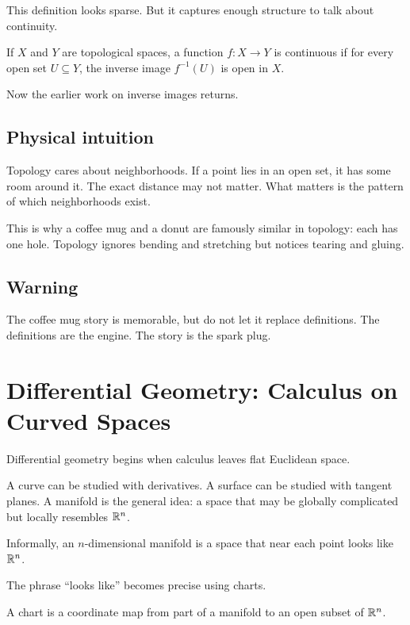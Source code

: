 \documentclass[11pt]{article}
\begin{document}
This definition looks sparse. But it captures enough structure to talk about continuity.

\begin{definition}
If $X$ and $Y$ are topological spaces, a function $f:X\to Y$ is continuous if for every open set $U\subseteq Y$, the inverse image $f^{-1}(U)$ is open in $X$.
\end{definition}

Now the earlier work on inverse images returns.

\subsection{Physical intuition}

Topology cares about neighborhoods. If a point lies in an open set, it has some room around it. The exact distance may not matter. What matters is the pattern of which neighborhoods exist.

This is why a coffee mug and a donut are famously similar in topology: each has one hole. Topology ignores bending and stretching but notices tearing and gluing.

\subsection{Warning}

The coffee mug story is memorable, but do not let it replace definitions. The definitions are the engine. The story is the spark plug.

\newpage
\section{Differential Geometry: Calculus on Curved Spaces}

Differential geometry begins when calculus leaves flat Euclidean space.

A curve can be studied with derivatives. A surface can be studied with tangent planes. A manifold is the general idea: a space that may be globally complicated but locally resembles $\mathbb{R}^n$.

\begin{definition}
Informally, an $n$-dimensional manifold is a space that near each point looks like $\mathbb{R}^n$.
\end{definition}

The phrase ``looks like'' becomes precise using charts.

\begin{definition}
A chart is a coordinate map from part of a manifold to an open subset of $\mathbb{R}^n$.
\end{definition}
\end{document}
